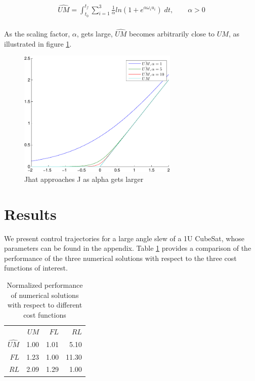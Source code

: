\documentclass[]{aiaa-tc}%
\begin{document}
\begin{align*}
\hat{UM} = \int_{t_{0}}^{t_{f}} \sum_{i = 1}^{3}\frac{1}{\alpha}ln(1+e^{\alpha \omega_{i} u_{i}}) \; dt, \qquad \alpha > 0 \\
\end{align*}

As the scaling factor, $\alpha$, gets large, $\hat{UM}$ becomes arbitrarily close to $UM$, as illustrated in figure \ref{f:UMhat}.

\begin{figure}[h!]%
\centering
 \includegraphics[width = 3in]{cfapprox}
 \caption{Jhat approaches J as alpha gets larger}
 \label{f:UMhat}
\end{figure}

\section{Results}
We present control trajectories for a large angle slew of a 1U CubeSat, whose parameters can be found in the appendix. Table \ref{t:pcomp} provides a comparison of the performance of the three numerical solutions with respect to the three cost functions of interest.

\begin{table}%
 \begin{center}
  \label{t:pcomp}
  \begin{tabular}{rrrr}
        & $UM$ & $FL$ & $RL$ \\
        $\hat{UM}$ &  1.00 & 1.01 & 5.10 \\
        $FL$ &  1.23 & 1.00 & 11.30 \\
       $RL$ &  2.09 & 1.29 & 1.00 \\
         \end{tabular}
 \end{center}
   \caption{Normalized performance of numerical solutions with respect to different cost functions}
\end{table}
\end{document}
